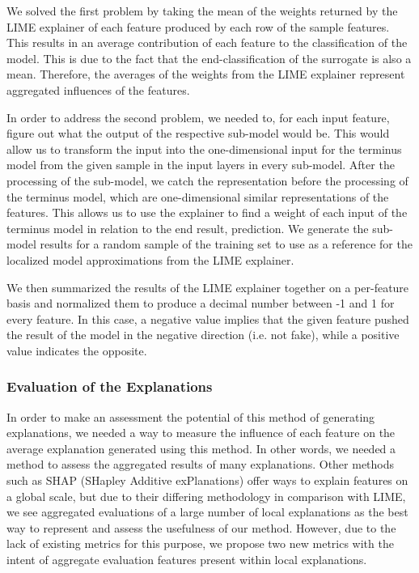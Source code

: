 \documentclass{article}
\begin{document}
We solved the first problem by taking the mean of the weights returned by the LIME explainer of each feature produced by each row of the sample features. This results in an average contribution of each feature to the classification of the model. This is due to the fact that the end-classification of the surrogate is also a mean. Therefore, the averages of the weights from the LIME explainer represent aggregated influences of the features.

In order to address the second problem, we needed to, for each input feature, figure out what the output of the respective sub-model would be. This would allow us to transform the input into the one-dimensional input for the terminus model from the given sample in the input layers in every sub-model. After the processing of the sub-model, we catch the representation before the processing of the terminus model, which are one-dimensional similar representations of the features. This allows us to use the explainer to find a weight of each input of the terminus model in relation to the end result, prediction. We generate the sub-model results for a random sample of the training set to use as a reference for the localized model approximations from the LIME explainer.

We then summarized the results of the LIME explainer together on a per-feature basis and normalized them to produce a decimal number between -1 and 1 for every feature. In this case, a negative value implies that the given feature pushed the result of the model in the negative direction (i.e. not fake), while a positive value indicates the opposite.
			
            
\subsubsection{Evaluation of the Explanations}
In order to make an assessment the potential of this method of generating explanations, we needed a way to measure the influence of each feature on the average explanation generated using this method. In other words, we needed a method to assess the aggregated results of many explanations. Other methods such as SHAP (SHapley Additive exPlanations) \cite{lundberg2017unified} offer ways to explain features on a global scale, but due to their differing methodology in comparison with LIME, we see aggregated evaluations of a large number of local explanations as the best way to represent and assess the usefulness of our method. However, due to the lack of existing metrics for this purpose, we propose two new metrics with the intent of aggregate evaluation features present within local explanations.
\end{document}
